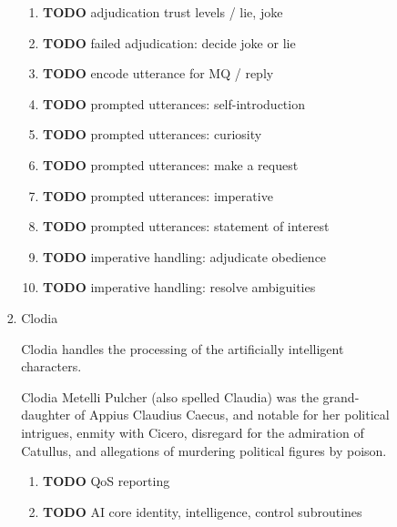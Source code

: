 \documentclass[11pt]{article}
\begin{document}
\begin{enumerate}
\begin{enumerate}
\begin{enumerate}
\begin{enumerate}
\begin{enumerate}
\item {\bfseries\sffamily TODO} adjudication trust levels / lie, joke
\label{sec-5-4-1-4-3-5-10}

\item {\bfseries\sffamily TODO} failed adjudication: decide joke or lie
\label{sec-5-4-1-4-3-5-11}

\item {\bfseries\sffamily TODO} encode utterance for MQ / reply
\label{sec-5-4-1-4-3-5-12}

\item {\bfseries\sffamily TODO} prompted utterances: self-introduction
\label{sec-5-4-1-4-3-5-13}

\item {\bfseries\sffamily TODO} prompted utterances: curiosity
\label{sec-5-4-1-4-3-5-14}

\item {\bfseries\sffamily TODO} prompted utterances: make a request
\label{sec-5-4-1-4-3-5-15}

\item {\bfseries\sffamily TODO} prompted utterances: imperative
\label{sec-5-4-1-4-3-5-16}

\item {\bfseries\sffamily TODO} prompted utterances: statement of interest
\label{sec-5-4-1-4-3-5-17}

\item {\bfseries\sffamily TODO} imperative handling: adjudicate obedience
\label{sec-5-4-1-4-3-5-18}

\item {\bfseries\sffamily TODO} imperative handling: resolve ambiguities
\label{sec-5-4-1-4-3-5-19}
\end{enumerate}
\item Clodia
\label{sec-5-4-1-4-3-6}

Clodia handles the processing of the artificially intelligent
characters.

Clodia Metelli Pulcher (also spelled Claudia) was the
grand-daughter of Appius Claudius Caecus, and notable for her
political intrigues, enmity with Cicero, disregard for the
admiration of Catullus, and allegations of murdering political
figures by poison.

\begin{enumerate}
\item {\bfseries\sffamily TODO} QoS reporting
\label{sec-5-4-1-4-3-6-1}

\item {\bfseries\sffamily TODO} AI core identity, intelligence, control subroutines
\label{sec-5-4-1-4-3-6-2}


\end{enumerate}
\end{enumerate}
\end{enumerate}
\end{enumerate}
\end{enumerate}
\end{document}
